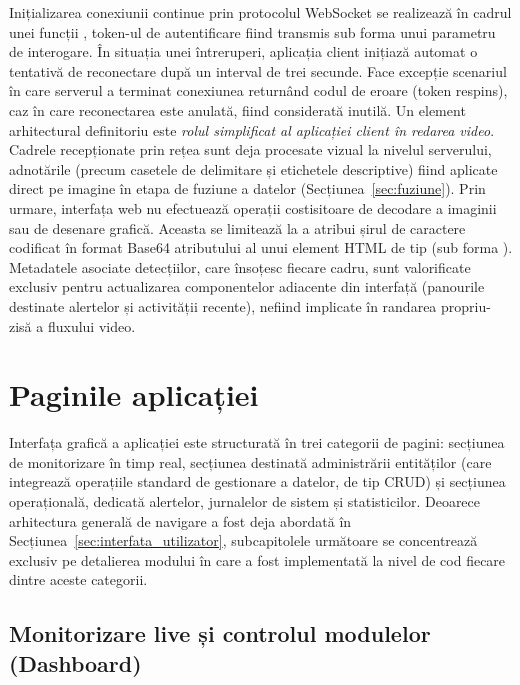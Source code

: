 \documentclass[../../main.tex]{subfiles}
\begin{document}
Inițializarea conexiunii continue prin protocolul WebSocket se realizează în cadrul unei funcții , token-ul de autentificare fiind transmis sub forma unui parametru de interogare. În situația unei întreruperi, aplicația client inițiază automat o tentativă de reconectare după un interval de trei secunde. Face excepție scenariul în care serverul a terminat conexiunea returnând codul de eroare  (token respins), caz în care reconectarea este anulată, fiind considerată inutilă. Un element arhitectural definitoriu este \emph{rolul simplificat al aplicației client în redarea video}. Cadrele recepționate prin rețea sunt deja procesate vizual la nivelul serverului, adnotările (precum casetele de delimitare și etichetele descriptive) fiind aplicate direct pe imagine în etapa de fuziune a datelor (Secțiunea~\ref{sec:fuziune}). Prin urmare, interfața web nu efectuează operații costisitoare de decodare a imaginii sau de desenare grafică. Aceasta se limitează la a atribui șirul de caractere codificat în format Base64 atributului  al unui element HTML de tip  (sub forma ). Metadatele asociate detecțiilor, care însoțesc fiecare cadru, sunt valorificate exclusiv pentru actualizarea componentelor adiacente din interfață (panourile destinate alertelor și activității recente), nefiind implicate în randarea propriu-zisă a \linebreak fluxului video.

\section{Paginile aplicației}
\label{sec:module_frontend}

Interfața grafică a aplicației este structurată în trei categorii de pagini: secțiunea de monitorizare în timp real, secțiunea destinată administrării entităților (care integrează operațiile standard de gestionare a datelor, de tip CRUD) și secțiunea operațională, dedicată alertelor, jurnalelor de sistem și statisticilor. Deoarece arhitectura generală de navigare a fost deja abordată în Secțiunea~\ref{sec:interfata_utilizator}, subcapitolele următoare se concentrează exclusiv pe detalierea modului în care a fost implementată la nivel de cod fiecare dintre aceste categorii.

\subsection{Monitorizare live și controlul modulelor (Dashboard)}
\label{subsec:fe_dashboard}
\end{document}
